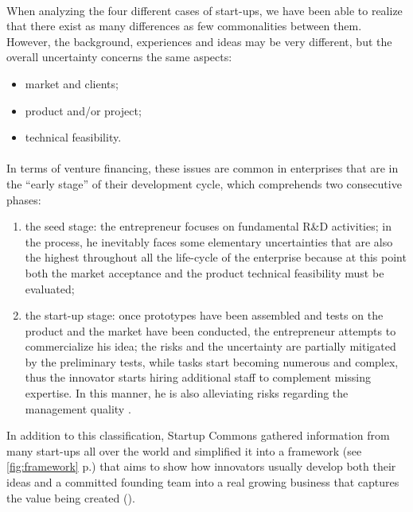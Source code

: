 \documentclass[twoside]{report}
\begin{document}
\paragraph{}
When analyzing the four different cases of start-ups, we have been able to realize that there exist as many differences as few commonalities between them. However, the background, experiences and ideas may be very different, but the overall uncertainty concerns the same aspects:
\begin{itemize}
\item market and clients;
\item product and/or project;
\item technical feasibility.
\end{itemize}
\paragraph{}
In terms of venture financing, these issues are common in enterprises that are in the “early stage” of their development cycle, which comprehends two consecutive phases: 
\begin{enumerate}
\item the seed stage: the entrepreneur focuses on fundamental R\&D activities; in the process, he inevitably faces some elementary uncertainties that are also the highest throughout all the life-cycle of the enterprise because at this point both the market acceptance and the product technical feasibility must be evaluated;
\item the start-up stage: once prototypes have been assembled and tests on the product and the market have been conducted, the entrepreneur attempts to commercialize his idea; the risks and the uncertainty are partially mitigated by the preliminary tests, while tasks start becoming numerous and complex, thus the innovator starts hiring additional staff to complement missing expertise. In this manner, he is also alleviating risks regarding the management quality \cite{eckermann_venture_2006}.
\end{enumerate}
In addition to this classification, Startup Commons gathered information from many start-ups all over the world and simplified it into a framework (see \ref{fig:framework} p.\pageref{fig:framework}) that aims to show how innovators usually develop both their ideas and a committed founding team into a real growing business that captures the value being created (\cite{startup_commons_startup_2015}).
\end{document}

